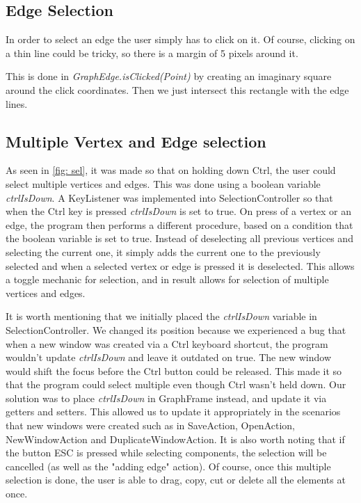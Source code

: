 \documentclass[a4paper]{article}
\begin{document}
\subsection{Edge Selection}
\par In order to select an edge the user simply has to click on it. Of course, clicking on a thin line could be tricky, so there is a margin of 5 pixels around it.
\par This is done in \textit{GraphEdge.isClicked(Point)} by creating an imaginary square around the click coordinates. Then we just intersect this rectangle with the edge lines.

\subsection{Multiple Vertex and Edge selection}
\par As seen in \ref{fig: sel}, it was made so that on holding down Ctrl, the user could select multiple vertices and edges. This was done using a boolean variable \textit{ctrlIsDown}. A KeyListener was implemented into SelectionController so that when the Ctrl key is pressed \textit{ctrlIsDown} is set to true. On press of a vertex or an edge, the program then performs a different procedure, based on a condition that the boolean variable is set to true. Instead of deselecting all previous vertices and selecting the current one, it simply adds the current one to the previously selected and when a selected vertex or edge is pressed it is deselected. This allows a toggle mechanic for selection, and in result allows for selection of multiple vertices and edges.
\par It is worth mentioning that we initially placed the \textit{ctrlIsDown} variable in SelectionController. We changed its position because we experienced a bug that when a new window was created via a Ctrl keyboard shortcut, the program wouldn't update \textit{ctrlIsDown} and leave it outdated on true. The new window would shift the focus before the Ctrl button could be released. This made it so that the program could select multiple even though Ctrl wasn't held down. Our solution was to place \textit{ctrlIsDown} in GraphFrame instead, and update it via getters and setters. This allowed us to update it appropriately in the scenarios that new windows were created such as in SaveAction, OpenAction, NewWindowAction and DuplicateWindowAction. It is also worth noting that if the button ESC is pressed while selecting components, the selection will be cancelled (as well as the "adding edge" action). Of course, once this multiple selection is done, the user is able to drag, copy, cut or delete all the elements at once.
\end{document}
